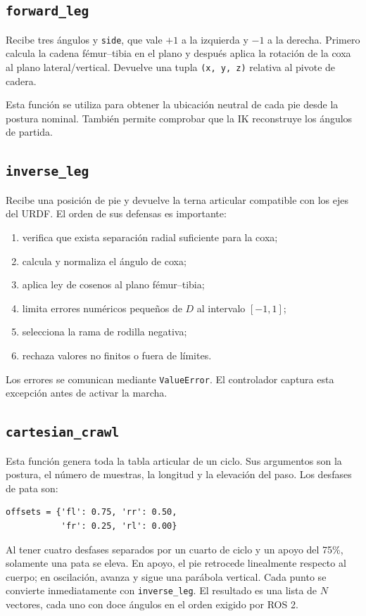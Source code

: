 \documentclass[11pt,a4paper]{article}
\begin{document}
\subsection{\texttt{forward\_leg}}
Recibe tres ángulos y \texttt{side}, que vale $+1$ a la izquierda y $-1$ a la
derecha. Primero calcula la cadena fémur--tibia en el plano y después aplica la
rotación de la coxa al plano lateral/vertical. Devuelve una tupla
\texttt{(x, y, z)} relativa al pivote de cadera.

Esta función se utiliza para obtener la ubicación neutral de cada pie desde la
postura nominal. También permite comprobar que la IK reconstruye los ángulos
de partida.

\subsection{\texttt{inverse\_leg}}
Recibe una posición de pie y devuelve la terna articular compatible con los
ejes del URDF. El orden de sus defensas es importante:
\begin{enumerate}
\item verifica que exista separación radial suficiente para la coxa;
\item calcula y normaliza el ángulo de coxa;
\item aplica ley de cosenos al plano fémur--tibia;
\item limita errores numéricos pequeños de $D$ al intervalo $[-1,1]$;
\item selecciona la rama de rodilla negativa;
\item rechaza valores no finitos o fuera de límites.
\end{enumerate}
Los errores se comunican mediante \texttt{ValueError}. El controlador captura
esta excepción antes de activar la marcha.

\subsection{\texttt{cartesian\_crawl}}
Esta función genera toda la tabla articular de un ciclo. Sus argumentos son la
postura, el número de muestras, la longitud y la elevación del paso. Los
desfases de pata son:
\begin{lstlisting}[style=python]
offsets = {'fl': 0.75, 'rr': 0.50,
           'fr': 0.25, 'rl': 0.00}
\end{lstlisting}
Al tener cuatro desfases separados por un cuarto de ciclo y un apoyo del 75\%,
solamente una pata se eleva. En apoyo, el pie retrocede linealmente respecto al
cuerpo; en oscilación, avanza y sigue una parábola vertical. Cada punto se
convierte inmediatamente con \texttt{inverse\_leg}. El resultado es una lista
de $N$ vectores, cada uno con doce ángulos en el orden exigido por ROS 2.
\end{document}
